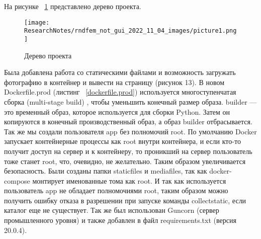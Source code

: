 \def\notedate{2022.11.04}
\def\currentauthor{Василян А.Р. (РК6-73Б)}

На рисунке ~\ref{picture1} представлено дерево проекта.
\begin{figure}[!ht]
  \centering
  \texttt{[image: ResearchNotes/rndfem\_not\_gui\_2022\_11\_04\_images/picture1.png]}
  \caption{Дерево проекта}
  \label{picture1}
\end{figure}
	Была добавлена работа со статическими файлами и возможность загружать фотографию в контейнер и вывести на страницу (рисунок 13).
	В новом \textsf{Dockerfile.prod} (листинг ~\ref{dockerfile.prod}) используется многоступенчатая сборка (\textsf{multi-stage build}) , чтобы уменьшить конечный размер образа. \textsf{builder} — это временный образ, которое используется для сборки \textsf{Python}. Затем он копируются в конечный производственный образ, а образ \textsf{builder} отбрасывается. Так же мы создали пользователя app без полномочий \textsf{root}. По умолчанию \textsf{Docker} запускает контейнерные процессы как \textsf{root} внутри контейнера, и если кто-то получит доступ на сервер и к контейнеру, то проникший на сервер пользователь тоже станет \textsf{root}, что, очевидно, не желательно. Таким образом увеличивается безопасность. Были созданы папки \textsf{staticfiles} и \textsf{mediafiles}, так как \textsf{docker-compose} монтирует именованные тома как \textsf{root}. И так как используется пользователь \textsf{app} не обладает полномочиями \textsf{root}, таким образом можно получить ошибку отказа в разрешении при запуске команды \textsf{collectstatic}, если каталог еще не существует.
	Так же был использован \textsf{Guncorn} (сервер промышленного уровня) и также добавлен в файл \textsf{requirements.txt} (версия \textsf{20.0.4}).

